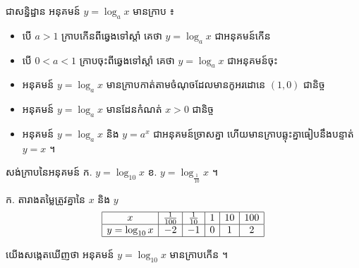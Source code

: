 ជាសន្និដ្ឋាន អនុគមន៍ $y = \log_a x$ មានក្រាប ៖
\begin{itemize}
  \item បើ $a > 1$ ក្រាបកើនពីឆ្វេងទៅស្តាំ គេថា $y = \log_a x$ ជាអនុគមន៍កើន
  \item បើ $0 < a < 1$ ក្រាបចុះពីឆ្វេងទៅស្តាំ គេថា $y = \log_a x$ ជាអនុគមន៍ចុះ
  \item អនុគមន៍ $y = \log_a x$ មានក្រាបកាត់តាមចំណុចដែលមានកូអរដោនេ $(1, 0)$ ជានិច្ច
  \item អនុគមន៍ $y = \log_a x$ មានដែនកំណត់ $x > 0$ ជានិច្ច
  \item អនុគមន៍ $y = \log_a x$ និង $y = a^x$ ជាអនុគមន៍ច្រាសគ្នា ហើយមានក្រាបឆ្លុះគ្នាធៀបនឹងបន្ទាត់ $y = x$ ។
\end{itemize}

\begin{example}[លំហាត់គំរូ ១]
សង់ក្រាបនៃអនុគមន៍ \quad ក. $y = \log_{10} x$ \qquad ខ. $y = \log_{\frac{1}{10}} x$ ។
\end{example}
\ans
ក. តារាងតម្លៃត្រូវគ្នានៃ $x$ និង $y$
\[
\begin{array}{|c|c|c|c|c|c|}\hline
x & \frac{1}{100} & \frac{1}{10} & 1 & 10 & 100\\ \hline
y = \log_{10} x & -2 & -1 & 0 & 1 & 2\\ \hline
\end{array}
\]
\begin{center}
\end{center}
យើងសង្កេតឃើញថា អនុគមន៍ $y = \log_{10} x$ មានក្រាបកើន ។

